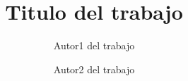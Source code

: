 \documentclass[final,fmstyle]{./util/fpunathesis}
\title{Titulo del trabajo}
\author{Autor1 del trabajo \and Autor2 del trabajo}
\begin{document}
\maketitle     %

%


\tableofcontents
\listoffigures
\listoftables
\listofalgorithms
%
\listofsymbols


\mainmatter  %



%
%
%
%
%
%

\appendix   %
%
\printbibliography
\end{document}
